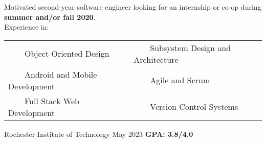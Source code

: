 \documentclass{awesome-cv}
\newcommand{\tabitem}{~~\llap{\textbullet}~~}
\begin{document}
	\makecvheader[C]

	\makecvfooter
		{}
		{}
		{}

		\vspace{-0.1cm}
		
		Motivated second-year software engineer looking for an internship or co-op during \textbf{summer and/or fall 2020}. \\ Experience in:
		
		\vspace{-0.1cm}
		\begin{center}
		\begin{tabular}{l@{\hskip 2cm}l}
		\tabitem Object Oriented Design & \tabitem Subsystem Design and Architecture \\
		\tabitem Android and Mobile Development & \tabitem Agile and Scrum \\
		\tabitem Full Stack Web Development  & \tabitem Version Control Systems
		\end{tabular}




		\end{center}
		\vspace{-0.25cm}
	
		\vspace{-0.15cm}
		\begin{cventries}
			\cventryB
				{}
				{Rochester Institute of Technology\small{\textnormal{\color{graytext}{\enskip B.S. Software Engineering}}}}
				{May 2023}
				{}
                		{\textbf{GPA: 3.8/4.0}}
		\end{cventries}
		
		\vspace{-0.2cm}

			\vspace{-0.2cm}
\end{document}
